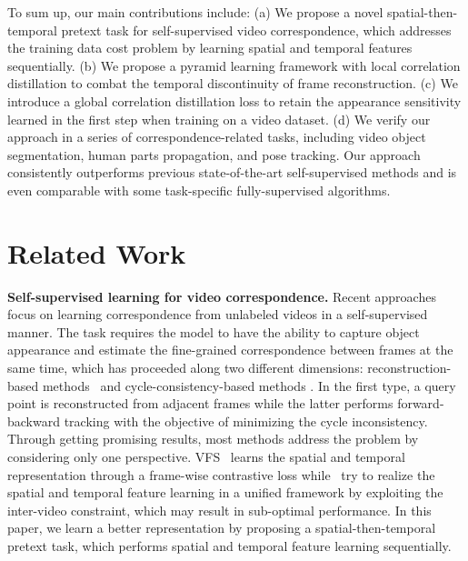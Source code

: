 \documentclass{article}
\begin{document}
To sum up, our main contributions include: (a) We propose a novel spatial-then-temporal pretext task for self-supervised video correspondence, which addresses the training data cost problem by learning spatial and temporal features sequentially. (b) We propose a pyramid learning framework with local correlation distillation to combat the temporal discontinuity of frame reconstruction. (c) We introduce a global correlation distillation loss to retain the appearance sensitivity learned in the first step when training on a video dataset. (d) We verify our approach in a series of correspondence-related tasks, including video object segmentation, human parts propagation, and pose tracking. Our approach consistently outperforms previous state-of-the-art self-supervised methods and is even comparable with some task-specific fully-supervised algorithms.

\section{Related Work}
\textbf{Self-supervised learning for video correspondence.} 
Recent approaches focus on learning correspondence from unlabeled videos in a self-supervised manner. The task requires the model to have the ability to capture object appearance and estimate the fine-grained correspondence between frames at the same time, which has proceeded along two different dimensions: reconstruction-based methods~\cite{lai2019self}\cite{lai2020mast}\cite{li2019joint}\cite{vondrick2018tracking}\cite{wang2020contrastive} and cycle-consistency-based methods \cite{jabri2020space}\cite{wang2019learning}\cite{zhao2021modelling}. In the first type, a query point is reconstructed from adjacent frames while the latter performs forward-backward tracking with the objective of minimizing the cycle inconsistency. Through getting promising results, most methods address the problem by considering only one perspective. VFS~\cite{xu2021rethinking} learns the spatial and temporal representation through a frame-wise contrastive loss while~\cite{araslanov2021dense}\cite{wang2020contrastive} try to realize the spatial and temporal feature learning in a unified framework by exploiting the inter-video constraint, which may result in sub-optimal performance. In this paper, we learn a better representation by proposing a spatial-then-temporal pretext task, which performs spatial and temporal feature learning sequentially.
\end{document}
